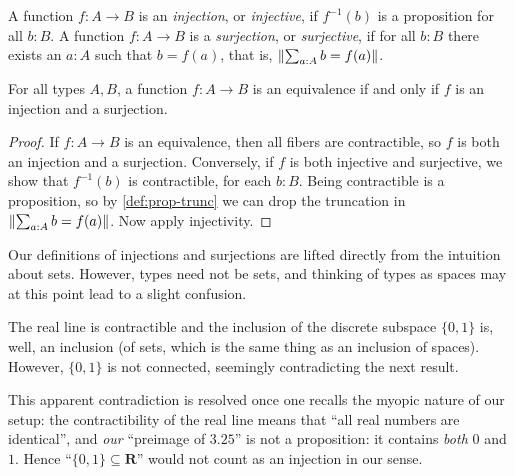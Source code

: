 \begin{definition}
\begin{definition}\label{def:injection}
A function $f:A\to B$ is an \emph{injection}, or \emph{injective}, 
if $f^{-1}(b)$ is a proposition for all $b:B$.
A function $f:A\to B$ is a \emph{surjection}, or \emph{surjective},
if for all $b:B$ there exists an $a:A$ such that $b=f(a)$,
that is, $\lVert\sum_{a:A} b=f(a)\rVert$.

\end{definition}

\begin{lemma}\label{lem:inj+surj}
For all types $A,B$, a function $f: A\to B$ is an equivalence 
if and only if $f$ is an injection and a surjection.
\end{lemma}

\begin{proof}
If $f: A\to B$ is an equivalence, then all fibers are contractible,
so $f$ is both an injection and a surjection. Conversely,
if $f$ is both injective and surjective, we show that
$f^{-1}(b)$ is contractible, for each $b:B$. 
Being contractible is a proposition, so by \cref{def:prop-trunc}
we can drop the truncation in $\lVert\sum_{a:A} b=f(a)\rVert$.
Now apply injectivity.
\end{proof}
\begin{remark}
  \label{rem:injectionsurjectionisnotwhatyouthink}
  Our definitions of injections and surjections are lifted directly from the intuition about sets.  However, types need not be sets, and thinking of types as spaces may at this point lead to a slight confusion.  

The real line is contractible and the inclusion of the discrete subspace $\{0,1\}$ is, well, an inclusion (of sets, which is the same thing as an inclusion of spaces).  However, $\{0,1\}$ is not connected, seemingly contradicting the next result.

  This apparent contradiction is resolved once one recalls the myopic nature of our setup: the contractibility of the real line means that ``all real numbers are identical'', and \emph{our} ``preimage of $3.25$'' is not a proposition: it contains \emph{both} $0$ and $1$.  Hence ``$\{0,1\}\subseteq\mathbf R$'' would not count as an injection in our sense.  
%
\end{remark}


\end{definition}
